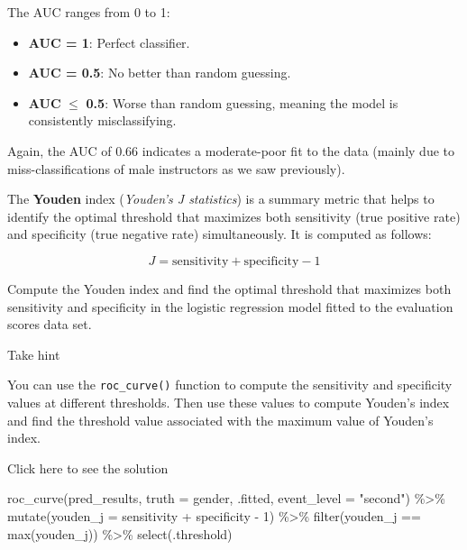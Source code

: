 \documentclass[
  letterpaper,
  DIV=11,
  numbers=noendperiod]{scrartcl}
\newenvironment{Shaded}{\begin{snugshade}}{\end{snugshade}}
\newcommand{\AttributeTok}[1]{\textcolor[rgb]{0.40,0.45,0.13}{#1}}
\newcommand{\DecValTok}[1]{\textcolor[rgb]{0.68,0.00,0.00}{#1}}
\newcommand{\FunctionTok}[1]{\textcolor[rgb]{0.28,0.35,0.67}{#1}}
\newcommand{\NormalTok}[1]{\textcolor[rgb]{0.00,0.23,0.31}{#1}}
\newcommand{\SpecialCharTok}[1]{\textcolor[rgb]{0.37,0.37,0.37}{#1}}
\newcommand{\StringTok}[1]{\textcolor[rgb]{0.13,0.47,0.30}{#1}}
\begin{document}
The AUC ranges from 0 to 1:

\begin{itemize}
\item
  \textbf{AUC = 1}: Perfect classifier.
\item
  \textbf{AUC = 0.5}: No better than random guessing.
\item
  \textbf{AUC} \(\leq\) \textbf{0.5}: Worse than random guessing,
  meaning the model is consistently misclassifying.
\end{itemize}

Again, the AUC of 0.66 indicates a moderate-poor fit to the data (mainly
due to miss-classifications of male instructors as we saw previously).

\begin{tcolorbox}[enhanced jigsaw, colframe=quarto-callout-warning-color-frame, toprule=.15mm, toptitle=1mm, opacitybacktitle=0.6, breakable, colback=white, opacityback=0, title={Task}, rightrule=.15mm, bottomrule=.15mm, coltitle=black, colbacktitle=quarto-callout-warning-color!10!white, leftrule=.75mm, left=2mm, arc=.35mm, bottomtitle=1mm, titlerule=0mm]

The \textbf{Youden} index (\emph{Youden's J statistics}) is a summary
metric that helps to identify the optimal threshold that maximizes both
sensitivity (true positive rate) and specificity (true negative rate)
simultaneously. It is computed as follows:

\[ J = \mathrm{sensitivity} + \mathrm{specificity} -1 \]

Compute the Youden index and find the optimal threshold that maximizes
both sensitivity and specificity in the logistic regression model fitted
to the evaluation scores data set.

Take hint

You can use the \texttt{roc\_curve()} function to compute the
sensitivity and specificity values at different thresholds. Then use
these values to compute Youden's index and find the threshold value
associated with the maximum value of Youden's index.

Click here to see the solution

\begin{Shaded}
\begin{Highlighting}[]
\FunctionTok{roc\_curve}\NormalTok{(pred\_results,}
          \AttributeTok{truth =}\NormalTok{ gender,}
\NormalTok{          .fitted,}
          \AttributeTok{event\_level =} \StringTok{"second"}\NormalTok{) }\SpecialCharTok{\%\textgreater{}\%} 
  \FunctionTok{mutate}\NormalTok{(}\AttributeTok{youden\_j =}\NormalTok{ sensitivity }\SpecialCharTok{+}\NormalTok{ specificity }\SpecialCharTok{{-}} \DecValTok{1}\NormalTok{) }\SpecialCharTok{\%\textgreater{}\%} 
  \FunctionTok{filter}\NormalTok{(youden\_j }\SpecialCharTok{==} \FunctionTok{max}\NormalTok{(youden\_j)) }\SpecialCharTok{\%\textgreater{}\%} 
  \FunctionTok{select}\NormalTok{(.threshold)}
\end{Highlighting}
\end{Shaded}


\end{tcolorbox}
\end{document}
